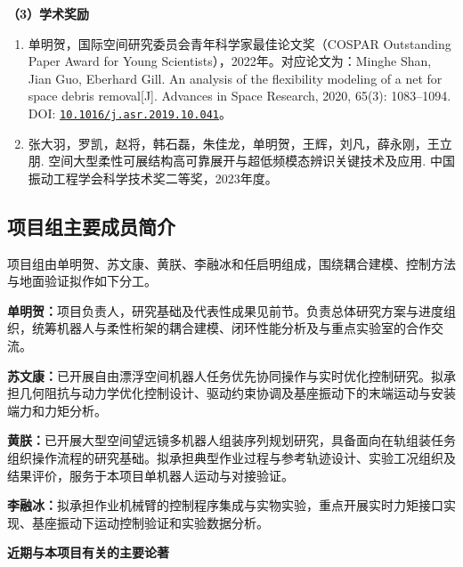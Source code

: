 \documentclass[UTF8,a4paper,zihao=-4,fontset=fandol]{ctexart}
\newcommand{\topic}[1]{\par\addvspace{0.5em}\noindent\textbf{#1}\par\nobreak}
\newcommand{\doi}[1]{\href{https://doi.org/#1}{\nolinkurl{#1}}}
\begin{document}
\topic{（3）学术奖励}

\begin{enumerate}[label=\arabic*.]
\item 单明贺，国际空间研究委员会青年科学家最佳论文奖（COSPAR Outstanding Paper Award for Young Scientists），2022年。对应论文为：Minghe Shan, Jian Guo, Eberhard Gill. An analysis of the flexibility modeling of a net for space debris removal[J]. Advances in Space Research, 2020, 65(3): 1083--1094. DOI: \doi{10.1016/j.asr.2019.10.041}。
\item 张大羽，罗凯，赵将，韩石磊，朱佳龙，单明贺，王辉，刘凡，薛永刚，王立朋. 空间大型柔性可展结构高可靠展开与超低频模态辨识关键技术及应用. 中国振动工程学会科学技术奖二等奖，2023年度。
\end{enumerate}

\subsection{项目组主要成员简介}

项目组由单明贺、苏文康、黄朕、李融冰和任启明组成，围绕耦合建模、控制方法与地面验证拟作如下分工。

\textbf{单明贺：}项目负责人，研究基础及代表性成果见前节。负责总体研究方案与进度组织，统筹机器人与柔性桁架的耦合建模、闭环性能分析及与重点实验室的合作交流。

\textbf{苏文康：}已开展自由漂浮空间机器人任务优先协同操作与实时优化控制研究。拟承担几何阻抗与动力学优化控制设计、驱动约束协调及基座振动下的末端运动与安装端力和力矩分析。

\textbf{黄朕：}已开展大型空间望远镜多机器人组装序列规划研究，具备面向在轨组装任务组织操作流程的研究基础。拟承担典型作业过程与参考轨迹设计、实验工况组织及结果评价，服务于本项目单机器人运动与对接验证。

\textbf{李融冰：}拟承担作业机械臂的控制程序集成与实物实验，重点开展实时力矩接口实现、基座振动下运动控制验证和实验数据分析。

\topic{近期与本项目有关的主要论著}
\end{document}
